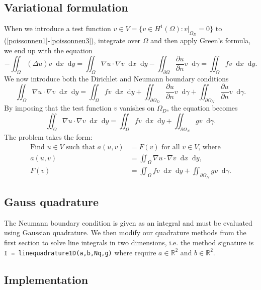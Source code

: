 \documentclass{report}
\renewcommand*\d{\mathop{}\!\mathrm{d}}
\begin{document}
\subsection{Variational formulation}

When we introduce a test function $v\in V =\{v\in H^1 (\Omega) : v|_{\Omega_D} = 0\}$ to (\ref{poissonneu1}-\ref{poissonneu3}), integrate over $\Omega$ and then apply Green's formula, we end up with the equation
\begin{equation}
	-\iint_{\Omega} (\Delta u) v \d x \d y = \iint_{\Omega}\nabla u \cdot \nabla v \d x \d y -  \iint_{\partial \Omega} \frac{\partial u}{\partial n} v \d\gamma = \iint_{\Omega}fv \d x \d y.
\end{equation}
We now introduce both the Dirichlet and Neumann boundary conditions
\begin{equation}
	\iint_{\Omega}\nabla u \cdot \nabla v \d x \d y = \iint_{\Omega}fv \d x \d y + \iint_{\partial \Omega_D} \frac{\partial u}{\partial n} v \d\gamma + \iint_{\partial \Omega_N} \frac{\partial u}{\partial n} v \d\gamma.
\end{equation}
By imposing that the test function $v$ vanishes on $\Omega_D$, the equation becomes
\begin{equation}
	\iint_{\Omega}\nabla u \cdot \nabla v \d x \d y = \iint_{\Omega}fv \d x \d y + \iint_{\partial \Omega_N} g v \d\gamma. 
\end{equation}
The problem takes the form:
\begin{align}
	\text{Find $u \in V$ such that } a(u,v) &= F(v) \text{ for all $v \in V$, where} \\
	a(u,v) &=  \iint_{\Omega} \nabla u \cdot \nabla v \d x \d y, \\
	F(v) &= \iint_{\Omega}fv \d x \d y + \iint_{\partial \Omega_N} g v \d\gamma.
\end{align}


\subsection{Gauss quadrature}

The Neumann boundary condition is given as an integral and must be evaluated using Gaussian quadrature. We then modify our quadrature methods from the first section to solve line integrals in two dimensions, i.e. the method signature is \texttt{I = linequadrature1D(a,b,Nq,g)} where require $a\in \mathbb{R}^2$ and $b\in \mathbb{R}^2$.

\subsection{Implementation}
\end{document}
